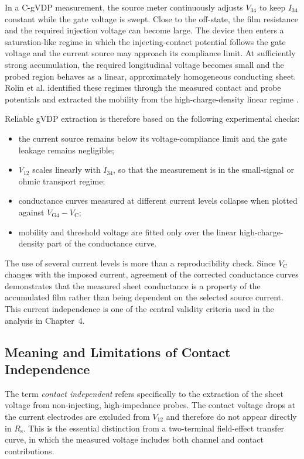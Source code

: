 In a C-gVDP measurement, the source meter continuously adjusts $V_{34}$ to keep
$I_{34}$ constant while the gate voltage is swept. Close to the off-state, the
film resistance and the required injection voltage can become large. The device
then enters a saturation-like regime in which the injecting-contact potential
follows the gate voltage and the current source may approach its compliance
limit. At sufficiently strong accumulation, the required longitudinal voltage
becomes small and the probed region behaves as a linear, approximately
homogeneous conducting sheet. Rolin et al. identified these regimes through the
measured contact and probe potentials and extracted the mobility from the
high-charge-density linear regime \cite{Rolin2017GVDP}.

Reliable gVDP extraction is therefore based on the following experimental
checks:
\begin{itemize}\itemsep0em
    \item the current source remains below its voltage-compliance limit and the
    gate leakage remains negligible;
    \item $V_{12}$ scales linearly with $I_{34}$, so that the measurement is in
    the small-signal or ohmic transport regime;
    \item conductance curves measured at different current levels collapse when
    plotted against $V_\mathrm{G4}-V_\mathrm{C}$;
    \item mobility and threshold voltage are fitted only over the linear
    high-charge-density part of the conductance curve.
\end{itemize}

The use of several current levels is more than a reproducibility check. Since
$V_\mathrm{C}$ changes with the imposed current, agreement of the corrected
conductance curves demonstrates that the measured sheet conductance is a
property of the accumulated film rather than being dependent on the selected source
current. This current independence is one of the central validity criteria used
in the analysis in Chapter~4.

\subsection{Meaning and Limitations of Contact Independence}
\label{subsec:gvdp_contact_independence}

The term \emph{contact independent} refers specifically to the extraction of
the sheet voltage from non-injecting, high-impedance probes. The contact voltage
drops at the current electrodes are excluded from $V_{12}$ and therefore do not
appear directly in $R_\mathrm{s}$. This is the essential distinction from a
two-terminal field-effect transfer curve, in which the measured voltage
includes both channel and contact contributions. 

